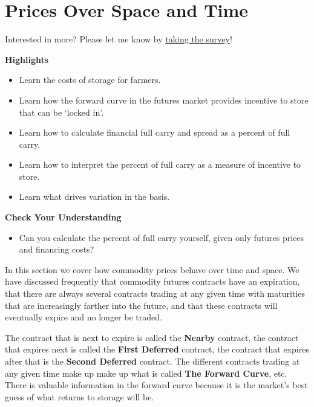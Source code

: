 \documentclass[
  letterpaper,
  DIV=11,
  numbers=noendperiod]{scrreprt}
\providecommand{\tightlist}{%
  \setlength{\itemsep}{0pt}\setlength{\parskip}{0pt}}\usepackage{longtable,booktabs,array}
\begin{document}

\chapter{Prices Over Space and Time}\label{prices-over-space-and-time}

{Interested in more? Please let me know by}
\href{https://forms.gle/Q3VByCQZHjfQSy9D7}{taking the survey}!

\textbf{Highlights}

\begin{itemize}
\tightlist
\item
  Learn the costs of storage for farmers.
\item
  Learn how the forward curve in the futures market provides incentive
  to store that can be `locked in'.
\item
  Learn how to calculate financial full carry and spread as a percent of
  full carry.
\item
  Learn how to interpret the percent of full carry as a measure of
  incentive to store.
\item
  Learn what drives variation in the basis.
\end{itemize}

\textbf{Check Your Understanding}

\begin{itemize}
\tightlist
\item
  Can you calculate the percent of full carry yourself, given only
  futures prices and financing costs?
\end{itemize}

In this section we cover how commodity prices behave over time and
space. We have discussed frequently that commodity futures contracts
have an expiration, that there are always several contracts trading at
any given time with maturities that are increasingly farther into the
future, and that these contracts will eventually expire and no longer be
traded.

The contract that is next to expire is called the \textbf{Nearby}
contract, the contract that expires next is called the \textbf{First
Deferred} contract, the contract that expires after that is the
\textbf{Second Deferred} contract. The different contracts trading at
any given time make up make up what is called \textbf{The Forward
Curve}, etc. There is valuable information in the forward curve because
it is the market's best guess of what returns to storage will be.
\end{document}
